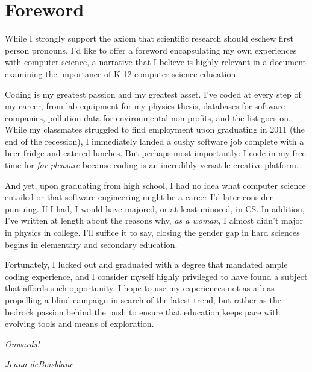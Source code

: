 \chapter{Foreword} %

\label{Foreword} %


While I strongly support the axiom that scientific research should eschew first person pronouns, I'd like to offer a foreword encapsulating my own experiences with computer science, a narrative that I believe is highly relevant in a document examining the importance of K-12 computer science education. \par  
Coding is my greatest passion and my greatest asset. I've coded at every step of my career, from lab equipment for my physics thesis, databases for software companies, pollution data for environmental non-profits, and the list goes on. While my classmates struggled to find employment upon graduating in 2011 (the end of the recession), I immediately landed a cushy software job complete with a beer fridge and catered lunches. But perhaps most importantly: I code in my free time for \emph{for pleasure} because coding is an incredibly versatile creative platform. \par
And yet, upon graduating from high school, I had no idea what computer science entailed or that software engineering might be a career I'd later consider pursuing. If I had, I would have majored, or at least minored, in CS. In addition, I've written at length about the reasons why, \textit{as a woman}, I almost didn't major in physics in college. I'll suffice it to say, closing the gender gap in hard sciences begins in elementary and secondary education. \par
Fortunately, I lucked out and graduated with a degree that mandated ample coding experience, and I consider myself highly privileged to have found a subject that affords such opportunity. I hope to use my experiences not as a bias propelling a blind campaign in search of the latest trend, but rather as the bedrock passion behind the push to ensure that education keeps pace with evolving tools and means of exploration. \par 
\emph{Onwards!} \par
\emph{Jenna deBoisblanc}
